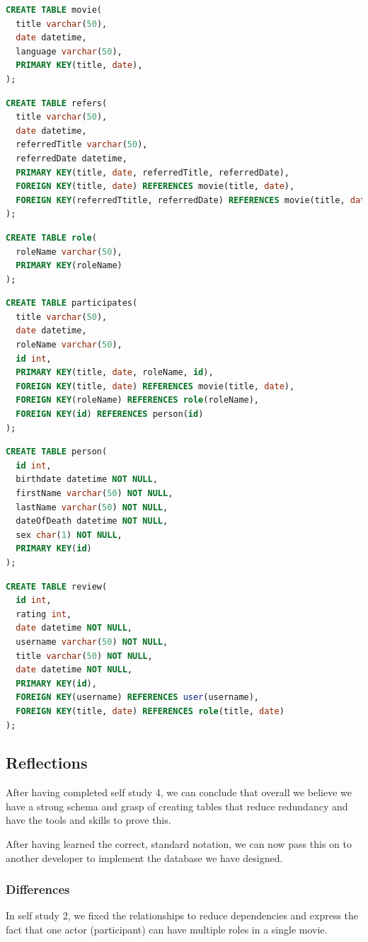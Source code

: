 \begin{lstlisting}[language=SQL]
CREATE TABLE movie(
  title varchar(50),
  date datetime,
  language varchar(50),
  PRIMARY KEY(title, date),
);
\end{lstlisting}

\begin{lstlisting}[language=SQL]
CREATE TABLE refers(
  title varchar(50),
  date datetime,
  referredTitle varchar(50),
  referredDate datetime,
  PRIMARY KEY(title, date, referredTitle, referredDate),
  FOREIGN KEY(title, date) REFERENCES movie(title, date),
  FOREIGN KEY(referredTtitle, referredDate) REFERENCES movie(title, date)
);
\end{lstlisting}

\begin{lstlisting}[language=SQL]
CREATE TABLE role(
  roleName varchar(50),
  PRIMARY KEY(roleName)
);
\end{lstlisting}

\begin{lstlisting}[language=SQL]
CREATE TABLE participates(
  title varchar(50),
  date datetime,
  roleName varchar(50),
  id int,
  PRIMARY KEY(title, date, roleName, id),
  FOREIGN KEY(title, date) REFERENCES movie(title, date),
  FOREIGN KEY(roleName) REFERENCES role(roleName),
  FOREIGN KEY(id) REFERENCES person(id)
);
\end{lstlisting}

\begin{lstlisting}[language=SQL]
CREATE TABLE person(
  id int,
  birthdate datetime NOT NULL,
  firstName varchar(50) NOT NULL,
  lastName varchar(50) NOT NULL,
  dateOfDeath datetime NOT NULL,
  sex char(1) NOT NULL,
  PRIMARY KEY(id)
);
\end{lstlisting}

\begin{lstlisting}[language=SQL]
CREATE TABLE review(
  id int,
  rating int,
  date datetime NOT NULL,
  username varchar(50) NOT NULL,
  title varchar(50) NOT NULL,
  date datetime NOT NULL,
  PRIMARY KEY(id),
  FOREIGN KEY(username) REFERENCES user(username),
  FOREIGN KEY(title, date) REFERENCES role(title, date)
);
\end{lstlisting}

\subsection{Reflections}
After having completed self study 4, we can conclude that overall we believe we have a strong schema and grasp of creating tables that reduce redundancy and have the tools and skills to prove this.

After having learned the correct, standard notation, we can now pass this on to another developer to implement the database we have designed.

\subsubsection{Differences}
In self study 2, we fixed the relationships to reduce dependencies and express the fact that one actor (participant) can have multiple roles in a single movie.
